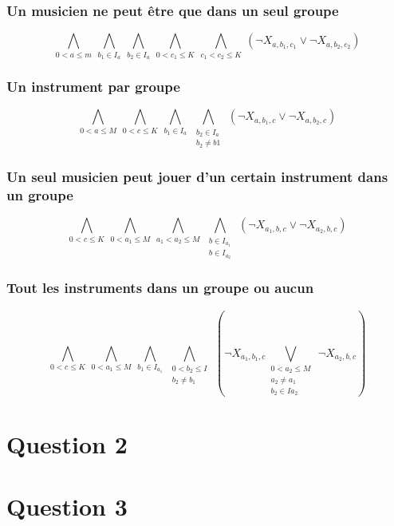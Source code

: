 \documentclass[11pt]{article}
\begin{document}
\subsubsection{Un musicien ne peut être que dans un seul groupe}

$$\bigwedge\limits_{0<a\le m}\ \bigwedge\limits_{b_1\in I_a}\ \bigwedge\limits_{b_2\in I_a}\ \bigwedge\limits_{0<c_1\le K}\ \bigwedge\limits_{c_1<c_2\le K}\ \left(\neg X_{a,b_1,c_1} \vee \neg X_{a,b_2,c_2}\right)$$

\subsubsection{Un instrument par groupe}

$$\bigwedge\limits_{0<a\le M}\ \bigwedge\limits_{0<c\le K}\ \bigwedge\limits_{b_1\in I_a}\ \bigwedge\limits_{\substack{b_2\in I_a \\ b_2 \ne b1}}\ \left(\neg X_{a,b_1,c} \vee \neg X_{a,b_2,c}\right)$$

\subsubsection{Un seul musicien peut jouer d'un certain instrument dans un groupe}

$$\bigwedge\limits_{0<c\le K}\ \bigwedge\limits_{0<a_1\le M}\ \bigwedge\limits_{a_1<a_2\le M}\ \bigwedge\limits_{\substack{b\in I_{a_1} \\ b\in I_{a_2}}}\ \left(\neg X_{a_1,b,c} \vee \neg X_{a_2,b,c}\right)$$

\subsubsection{Tout les instruments dans un groupe ou aucun}

$$\bigwedge\limits_{0<c\le K}\ \bigwedge\limits_{0<a_1\le M}\ \bigwedge\limits_{b_1\in I_{a_1}}\ \bigwedge\limits_{\substack{0<b_2\le I \\ b_2 \ne b_1}}\ \left(\neg X_{a_1,b_1,c} \bigvee\limits_{\substack{0<a_2\le M \\ a_2 \ne a_1 \\ b_2 \in I{a_2}}}\ \neg X_{a_2,b,c}\right)$$

\section{Question 2}

\section{Question 3}
\end{document}
